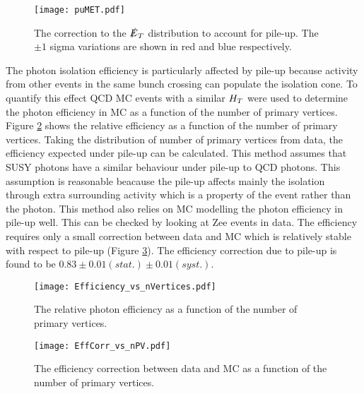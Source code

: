 \begin{figure}
\begin{center}
\texttt{[image: puMET.pdf]}
\end{center}
\caption{The correction to the $\slashed{E}_{T}$ distribution to account for pile-up. The
$\pm 1$ sigma variations are shown in red and blue respectively.}
\label{fig:puMET}
\end{figure}

The photon isolation efficiency is particularly affected by pile-up because
activity from other events in the same bunch crossing can populate the isolation
cone. To quantify this effect QCD MC events with a similar $H_{T}$ were used to
determine the photon efficiency in MC as a function of the number of primary
vertices. Figure \ref{fig:Efficiency_vs_nVertices} shows the relative efficiency
as a function of the number of primary vertices. Taking the distribution of 
number of primary vertices from data, the efficiency expected under pile-up can 
be calculated. This method assumes that SUSY photons have a similar behaviour 
under pile-up to QCD photons. This assumption is reasonable beacause the pile-up 
affects mainly the isolation through extra surrounding activity which is a 
property of the event rather than the photon. This method also relies on MC 
modelling the photon efficiency in pile-up well. This can be checked by looking 
at Zee events in data. The efficiency requires only a small correction between 
data and MC which is relatively stable with respect to pile-up (Figure 
\ref{fig:EffCorr_vs_nPV}). The efficiency correction due to pile-up is found to 
be $0.83\pm0.01(stat.)\pm0.01(syst.)$. \\

\begin{figure}
\begin{center}
\texttt{[image: Efficiency\_vs\_nVertices.pdf]}
\end{center}
\caption{The relative photon efficiency as a function of the number of primary 
vertices.}
\label{fig:Efficiency_vs_nVertices}
\end{figure}

\begin{figure}
\begin{center}
\texttt{[image: EffCorr\_vs\_nPV.pdf]}
\end{center}
\caption{The efficiency correction between data and MC as a function of the
number of primary vertices.}
\label{fig:EffCorr_vs_nPV}
\end{figure}

